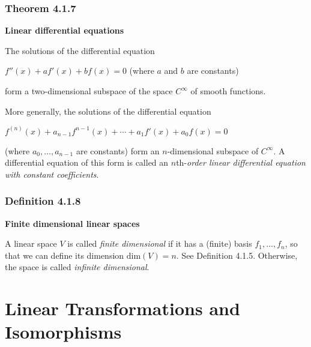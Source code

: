 \documentclass{report}
\begin{document}
\subsubsection*{Theorem 4.1.7}
\par\noindent\textbf{Linear differential equations}
\par\noindent The solutions of the differential equation
\par\noindent\begin{center}$f''(x)+af'(x)+bf(x)=0$ (where $a$ and $b$ are constants)\end{center}
\par\noindent form a two-dimensional subspace of the space $C^{\infty}$ of smooth functions.
\par\noindent More generally, the solutions of the differential equation
\par\noindent\begin{center}$f^{(n)}(x)+a_{n-1}f^{n-1}(x)+\cdots{}+a_{1}f'(x)+a_{0}f(x)=0$\end{center}
\par\noindent (where $a_{0},\ldots{},a_{n-1}$ are constants) form an $n$-dimensional subspace of $C^{\infty}$. A differential equation of this form is called an $n$th-\textit{order linear differential equation with constant coefficients}.
\subsubsection*{Definition 4.1.8}
\par\noindent\textbf{Finite dimensional linear spaces}
\par\noindent A linear space $V$ is called \textit{finite dimensional} if it has a (finite) basis $f_{1},\ldots{},f_{n}$, so that we can define its dimension $\textrm{dim}(V)=n$. See Definition 4.1.5. Otherwise, the space is called \textit{infinite dimensional}.

\section{Linear Transformations and Isomorphisms}
\end{document}
